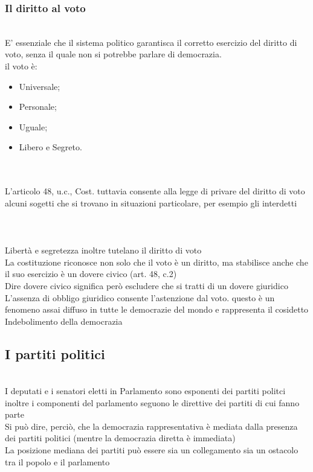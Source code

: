 \documentclass{report}
\begin{document}
\subsubsection{Il diritto al voto}
\\
E' essenziale che il sistema politico garantisca il corretto esercizio del diritto di voto, senza il quale non si potrebbe parlare di democrazia.
\\
il voto è:
\\
\begin{itemize}
  \item Universale;
  \item Personale;
  \item Uguale;
  \item Libero e Segreto.
\end{itemize}
\\
\\
L'articolo 48, u.c., Cost. tuttavia consente alla legge di privare del diritto di voto alcuni sogetti che si trovano in situazioni particolare, per esempio gli interdetti
\\
\\
\\
\\
Libertà e segretezza inoltre tutelano il diritto di voto
\\
La costituzione riconosce non solo che il voto è un diritto, ma stabilisce anche che il suo esercizio è un dovere civico (art. 48, c.2)
\\
Dire dovere civico significa però escludere che si tratti di un dovere giuridico
\\
L'assenza di obbligo giuridico consente l'astenzione dal voto. questo è un fenomeno assai diffuso in tutte le democrazie del mondo e rappresenta il cosidetto Indebolimento della democrazia
\\
\subsection{I partiti politici}
\\
I deputati e i senatori eletti in Parlamento sono esponenti dei partiti politci inoltre i componenti del parlamento seguono le direttive dei partiti di cui fanno parte
\\
Si può dire, perciò, che la democrazia rappresentativa è mediata dalla presenza dei partiti politici (mentre la democrazia diretta è immediata)
\\
La posizione mediana dei partiti può essere sia un collegamento sia un ostacolo tra il popolo e il parlamento
\\
\end{document}

